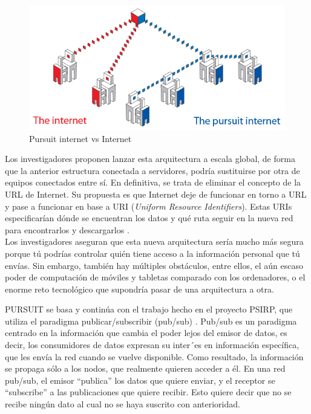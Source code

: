 \documentclass[a4paper,12pt]{article}
\begin{document}
\begin{figure}
 \centering
 \includegraphics[scale = 0.5]{1.jpg}
 \caption{Pursuit internet vs Internet \cite{UC}}
 \label{fig:PvsI}
\end{figure}

Los investigadores proponen lanzar esta arquitectura a escala global, de forma que la anterior estructura conectada a servidores,
podría sustituirse por otra de equipos conectados entre sí. En definitiva, se trata de eliminar el concepto de la URL de Internet.
Su propuesta es que Internet deje de funcionar en torno a URL y pase a funcionar en base a URI (\textit{Uniform Resource Identifiers}).
Estas URIs especificarían dónde se encuentran los datos y qué ruta seguir en la nueva red para encontrarlos y descargarlos \cite{Omi}. \\
Los investigadores aseguran que esta nueva arquitectura sería mucho más segura porque tú podrías controlar quién tiene acceso
a la información personal que tú envías. Sin embargo, también hay múltiples obstáculos, entre ellos, el aún escaso poder de
computación de móviles y tabletas comparado con los ordenadores, o el enorme reto tecnológico que supondría pasar de una
arquitectura a otra. \par

PURSUIT se basa y continúa con el trabajo hecho en el proyecto PSIRP, que utiliza el paradigma publicar/subscribir (pub/sub) \cite{ps}.
Pub/sub es un paradigma centrado en la información que cambia el poder lejos del emisor de datos, es decir, los consumidores de datos expresan su inter´es
en información específica, que les envía la red cuando se vuelve disponible. Como resultado, la información se propaga sólo a los nodos, que realmente quieren acceder
a él. En una red pub/sub, el emisor ``publica'' los datos que quiere enviar, y el receptor se ``subscribe'' a las publicaciones
que quiere recibir. Esto quiere decir que no se recibe ningún dato al cual no se haya suscrito con anterioridad.
\end{document}
